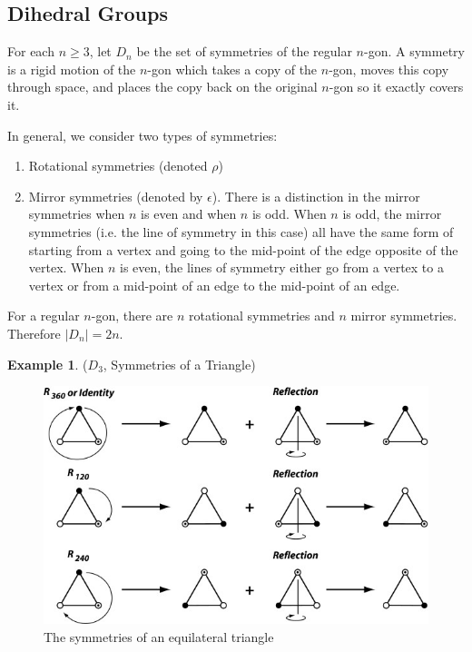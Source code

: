 \documentclass[12pt]{article}
\theoremstyle{definition}
\newtheorem{example}{Example}
\theoremstyle{definition}
\newcommand{\e}{\epsilon}
\begin{document}
\subsection{Dihedral Groups}
For each $n \geq 3$, let $D_n$ be the set of symmetries of the regular $n$-gon. A symmetry is a rigid motion of the $n$-gon which takes a copy of the $n$-gon, moves this copy through space, and places the copy back on the original $n$-gon so it exactly covers it.  

In general, we consider two types of symmetries:
\begin{enumerate}
	\item Rotational symmetries (denoted $\rho$)
	\item Mirror symmetries (denoted by $\e$). There is a distinction in the mirror symmetries when $n$ is even and when $n$ is odd. When $n$ is odd, the mirror symmetries (i.e. the line of symmetry in this case) all have the same form of starting from a vertex and going to the mid-point of the edge opposite of the vertex. When $n$ is even, the lines of symmetry either go from a vertex to a vertex or from a mid-point of an edge to the mid-point of an edge. 
\end{enumerate}
For a regular $n$-gon, there are $n$ rotational symmetries and $n$ mirror symmetries. Therefore $|D_n| = 2n$.

\begin{example}($D_3$, Symmetries of a Triangle)
\begin{figure}[H]
	\begin{center}
		\includegraphics[scale=3]{triangle_symmetries}
	\end{center}
	\caption{The symmetries of an equilateral triangle}
	\label{triangle_sym}
\end{figure}
\end{example}
\end{document}
